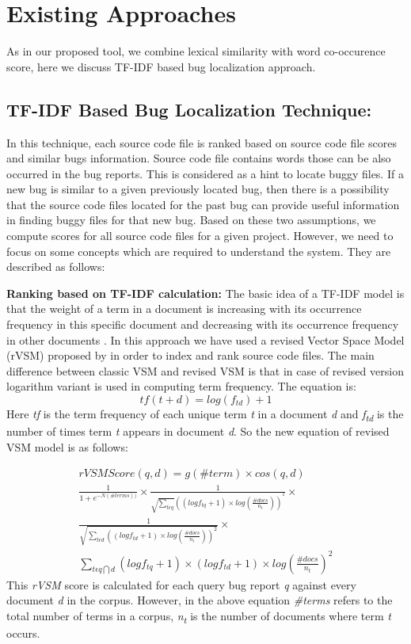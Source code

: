 \documentclass[conference]{IEEEtran}
\begin{document}
\section{Existing Approaches}\label{sec:existing}
As in our proposed tool, we combine lexical similarity with word co-occurence score, here we discuss TF-IDF based bug localization approach.
\subsection{TF-IDF Based Bug Localization Technique:}
In this technique, each source code file is ranked based on source code file scores and similar bugs information. Source code file contains words those can be also occurred in the bug reports. This is considered as a hint to locate buggy files. If a new bug is similar to a given previously located bug, then there is a possibility that the source code files located for the past bug can provide useful information in finding buggy files for that new bug. Based on these two assumptions, we compute scores for all source code files for a given project. However, we need to focus on some concepts which are required to understand the  system. They are described as follows:

\textbf{Ranking based on TF-IDF calculation:}
The basic idea of a TF-IDF model is that the weight of a term in a document is increasing with its occurrence frequency in this specific document and decreasing with its occurrence frequency in other documents \cite{Jian}.
In this approach we have used a revised Vector Space Model (rVSM) proposed by \citet{Jian} in order to index and rank source code files. 
The main difference between classic VSM and revised VSM is that in case of revised version logarithm variant is used in computing term frequency. The equation is:
\begin{equation}
tf(t+d)=log(f_{td})+1
\end{equation}
Here \textit{tf} is the term frequency of each unique term \textit{t} in a document \textit{d} and \textit{f\textsubscript{td}} is the number of times term \textit{t} appears in document \textit{d}.
So the new equation of revised VSM model is as follows:

\begin{multline}\label{rVSMequation}
rVSMScore(q,d)=g(\#term)\times cos(q,d)
\\
\frac{1}{1+e^{-N(\#terms))}}\times \frac{1}{\sqrt{\sum_{t\epsilon q}}((logf_{tq}+1)\times log(\frac{\#docs}{n_{t}}))^{^{2}}}\times 
\\
\frac{1}{\sqrt{\sum_{t\epsilon d}((log {f_{td}+1})\times log(\frac{\#docs}{n_{t}}))^{2}}}\times
\\
\sum_{t\epsilon q\bigcap d}(logf_{tq}+1)\times (logf_{td}+1)\times log(\frac{\#docs}{n_{t}})^{2}
\end{multline}
This \textit{rVSM} score is calculated for each query bug report \textit{q} against every document \textit{d} in the corpus. However, in the above equation \textit{\#terms} refers to the total number of terms in a corpus, \textit{n\textsubscript{t}} is the number of documents where term \textit{t} occurs.
\end{document}
